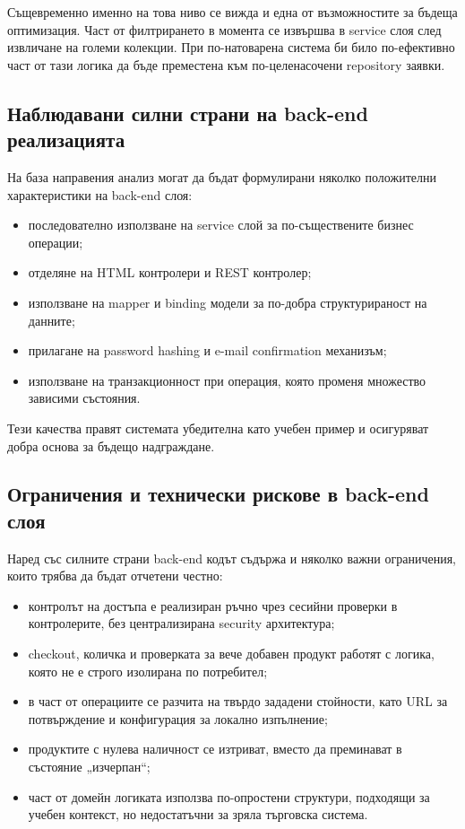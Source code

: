 Същевременно именно на това ниво се вижда и една от възможностите за бъдеща оптимизация. Част от филтрирането в момента се извършва в service слоя след извличане на големи колекции. При по-натоварена система би било по-ефективно част от тази логика да бъде преместена към по-целенасочени repository заявки.

\subsection{Наблюдавани силни страни на back-end реализацията}

На база направения анализ могат да бъдат формулирани няколко положителни характеристики на back-end слоя:

\begin{itemize}[leftmargin=*]
    \item последователно използване на service слой за по-съществените бизнес операции;
    \item отделяне на HTML контролери и REST контролер;
    \item използване на mapper и binding модели за по-добра структурираност на данните;
    \item прилагане на password hashing и e-mail confirmation механизъм;
    \item използване на транзакционност при операция, която променя множество зависими състояния.
\end{itemize}

Тези качества правят системата убедителна като учебен пример и осигуряват добра основа за бъдещо надграждане.

\subsection{Ограничения и технически рискове в back-end слоя}

Наред със силните страни back-end кодът съдържа и няколко важни ограничения, които трябва да бъдат отчетени честно:

\begin{itemize}[leftmargin=*]
    \item контролът на достъпа е реализиран ръчно чрез сесийни проверки в контролерите, без централизирана security архитектура;
    \item checkout, количка и проверката за вече добавен продукт работят с логика, която не е строго изолирана по потребител;
    \item в част от операциите се разчита на твърдо зададени стойности, като URL за потвърждение и конфигурация за локално изпълнение;
    \item продуктите с нулева наличност се изтриват, вместо да преминават в състояние „изчерпан“;
    \item част от домейн логиката използва по-опростени структури, подходящи за учебен контекст, но недостатъчни за зряла търговска система.
\end{itemize}

